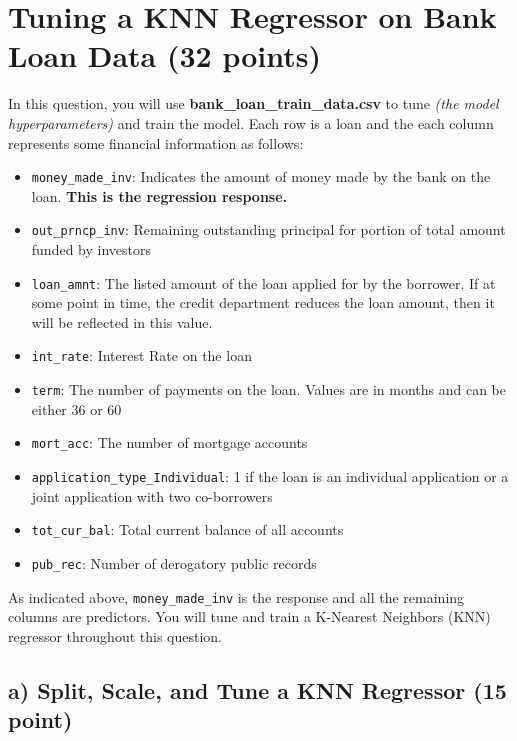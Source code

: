 \documentclass[
  letterpaper,
  DIV=11,
  numbers=noendperiod]{scrreprt}
\begin{document}
\section{Tuning a KNN Regressor on Bank Loan Data (32
points)}\label{tuning-a-knn-regressor-on-bank-loan-data-32-points}

In this question, you will use \textbf{bank\_loan\_train\_data.csv} to
tune \emph{(the model hyperparameters)} and train the model. Each row is
a loan and the each column represents some financial information as
follows:

\begin{itemize}
\item
  \texttt{money\_made\_inv}: Indicates the amount of money made by the
  bank on the loan. \textbf{This is the regression response.}
\item
  \texttt{out\_prncp\_inv}: Remaining outstanding principal for portion
  of total amount funded by investors
\item
  \texttt{loan\_amnt}: The listed amount of the loan applied for by the
  borrower. If at some point in time, the credit department reduces the
  loan amount, then it will be reflected in this value.
\item
  \texttt{int\_rate}: Interest Rate on the loan
\item
  \texttt{term}: The number of payments on the loan. Values are in
  months and can be either 36 or 60
\item
  \texttt{mort\_acc}: The number of mortgage accounts
\item
  \texttt{application\_type\_Individual}: 1 if the loan is an individual
  application or a joint application with two co-borrowers
\item
  \texttt{tot\_cur\_bal}: Total current balance of all accounts
\item
  \texttt{pub\_rec}: Number of derogatory public records
\end{itemize}

As indicated above, \texttt{money\_made\_inv} is the response and all
the remaining columns are predictors. You will tune and train a
K-Nearest Neighbors (KNN) regressor throughout this question.

\subsection{\texorpdfstring{a) Split, Scale, and Tune a KNN Regressor
\textbf{(15
point)}}{a) Split, Scale, and Tune a KNN Regressor (15 point)}}\label{a-split-scale-and-tune-a-knn-regressor-15-point}
\end{document}
